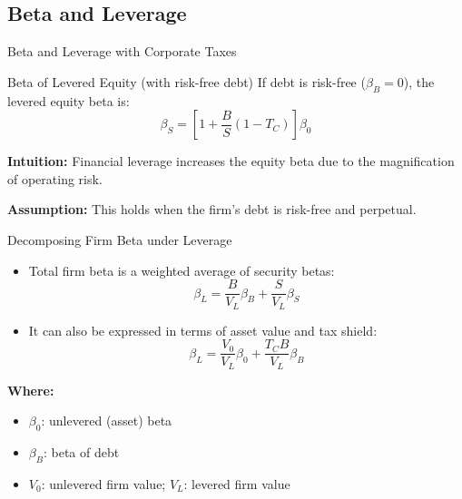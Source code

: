 \subsection{Beta and Leverage}
\begin{frame}{Beta and Leverage with Corporate Taxes}
	
	\begin{block}{Beta of Levered Equity (with risk-free debt)}
		If debt is risk-free ($\beta_B = 0$), the levered equity beta is:
		\begin{equation}
			\beta_S = \left[1 + \frac{B}{S}(1 - T_C)\right] \beta_0
			\label{eq:betalever}
		\end{equation}
	\end{block}
	
	\vspace{0.3cm}
	\textbf{Intuition:} Financial leverage increases the equity beta due to the magnification of operating risk.
	
	\vspace{0.2cm}
	\textbf{Assumption:} This holds when the firm's debt is risk-free and perpetual.
	
\end{frame}

\begin{frame}{Decomposing Firm Beta under Leverage}
	
	\begin{itemize}
		\item Total firm beta is a weighted average of security betas:
		\begin{equation}
			\beta_L = \frac{B}{V_L} \beta_B + \frac{S}{V_L} \beta_S
			\label{eq:betal}
		\end{equation}
		
		\item It can also be expressed in terms of asset value and tax shield:
		\begin{equation}
			\beta_L = \frac{V_0}{V_L} \beta_0 + \frac{T_C B}{V_L} \beta_B
			\label{eq:betatc}
		\end{equation}
	\end{itemize}
	
	\textbf{Where:}
	\begin{itemize}
		\item $\beta_0$: unlevered (asset) beta
		\item $\beta_B$: beta of debt
		\item $V_0$: unlevered firm value; $V_L$: levered firm value
	\end{itemize}
	
\end{frame}

